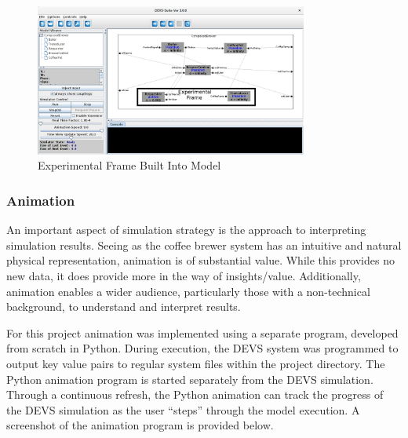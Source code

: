 \documentclass[10pt]{article}
\begin{document}
\begin{center}
  \begin{figure}[H]
    \begin{center}
      \includegraphics[width=0.8\textwidth]{input/ef-introduced}
      \caption{Experimental Frame Built Into Model}
      \label{ref:ef-introduced}
    \end{center}
  \end{figure}
\end{center}


\subsubsection{Animation}
An important aspect of simulation strategy is the approach to interpreting simulation results.  Seeing as the coffee brewer system has an intuitive and natural physical representation, animation is of substantial value.  While this provides no new data, it does provide more in the way of insights/value.  Additionally, animation enables a wider audience, particularly those with a non-technical background, to understand and interpret results.

For this project animation was implemented using a separate program, developed from scratch in Python.  During execution, the DEVS system was programmed to output key value pairs to regular system files within the project directory.  The Python animation program is started separately from the DEVS simulation.  Through a continuous refresh, the Python animation can track the progress of the DEVS simulation as the user ``steps'' through the model execution.  A screenshot of the animation program is provided below.
\end{document}
